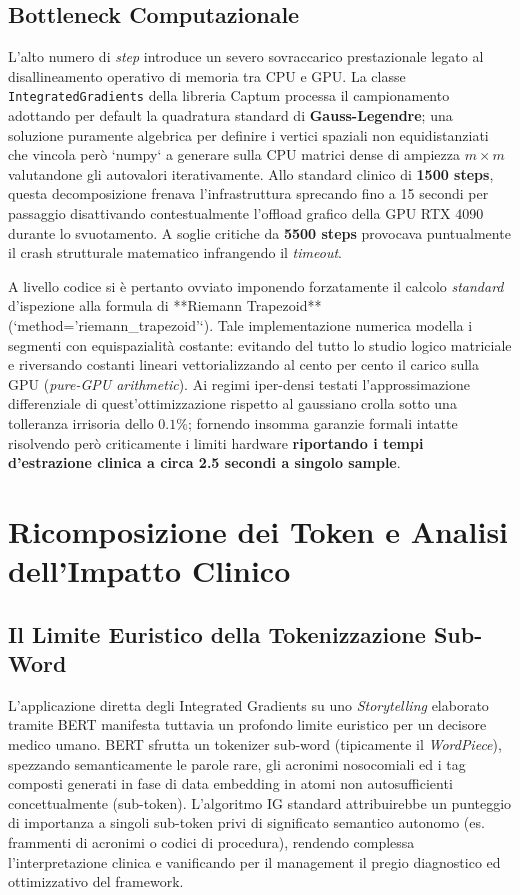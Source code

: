\subsection{Bottleneck Computazionale}
L'alto numero di \textit{step} introduce un severo sovraccarico prestazionale legato al disallineamento operativo di memoria tra CPU e GPU. La classe \texttt{IntegratedGradients} della libreria Captum processa il campionamento adottando per default la quadratura standard di \textbf{Gauss-Legendre}; una soluzione puramente algebrica per definire i vertici spaziali non equidistanziati che vincola però `numpy` a generare sulla CPU matrici dense di ampiezza $m \times m$ valutandone gli autovalori iterativamente. Allo standard clinico di \textbf{1500 steps}, questa decomposizione frenava l'infrastruttura sprecando fino a 15 secondi per passaggio disattivando contestualmente l'offload grafico della GPU RTX 4090 durante lo svuotamento. A soglie critiche da \textbf{5500 steps} provocava puntualmente il crash strutturale matematico infrangendo il \textit{timeout}.

A livello codice si è pertanto ovviato imponendo forzatamente il calcolo \textit{standard} d'ispezione alla formula di **Riemann Trapezoid** (`method='riemann\_trapezoid'`). Tale implementazione numerica modella i segmenti con equispazialità costante: evitando del tutto lo studio logico matriciale e riversando costanti lineari vettorializzando al cento per cento il carico sulla GPU (\textit{pure-GPU arithmetic}). Ai regimi iper-densi testati l'approssimazione differenziale di quest'ottimizzazione rispetto al gaussiano crolla sotto una tolleranza irrisoria dello $0.1\%$; fornendo insomma garanzie formali intatte risolvendo però criticamente i limiti hardware \textbf{riportando i tempi d'estrazione clinica a circa 2.5 secondi a singolo sample}.

\section{Ricomposizione dei Token e Analisi dell'Impatto Clinico}

\subsection{Il Limite Euristico della Tokenizzazione Sub-Word}
L'applicazione diretta degli Integrated Gradients su uno \textit{Storytelling} elaborato tramite BERT manifesta tuttavia un profondo limite euristico per un decisore medico umano. BERT sfrutta un tokenizer sub-word (tipicamente il \textit{WordPiece}), spezzando semanticamente le parole rare, gli acronimi nosocomiali ed i tag composti generati in fase di data embedding in atomi non autosufficienti concettualmente (sub-token). L'algoritmo IG standard attribuirebbe un punteggio di importanza a singoli sub-token privi di significato semantico autonomo (es. frammenti di acronimi o codici di procedura), rendendo complessa l'interpretazione clinica e vanificando per il management il pregio diagnostico ed ottimizzativo del framework.

